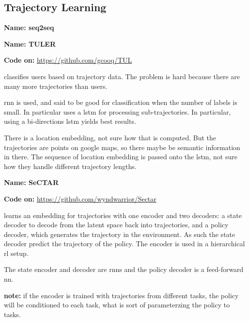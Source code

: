 \subsection{Trajectory Learning}\label{sec: traj learning}



\textbf{Name: seq2seq}

\cite{sutskever2014sequence}


\textbf{Name: TULER}

\textbf{Code on:} \url{https://github.com/gcooq/TUL}

\cite{gao2017identifying} classifies users based on trajectory data. The problem is hard because there are many more trajectories than users.

\gls{rnn} is used, and said to be good for classification when the number of labels is small. In particular uses a \gls{lstm} for processing sub-trajectories.
%
In particular, using a bi-directions \gls{lstm} yields best results. 

There is a location embedding, not sure how that is computed. But the trajectories are points on google maps, so there maybe be semantic information in there.
%
The sequence of location embedding is passed onto the \gls{lstm}, not sure how they handle different trajectory lengths.



\textbf{Name: SeCTAR}

\textbf{Code on:} \url{https://github.com/wyndwarrior/Sectar}

\cite{co2018self} learns an embedding for trajectories with one encoder and two decoders: a state decoder to decode from the latent space back into trajectories, and a policy decoder, which generates the trajectory in the environment. As such the state decoder predict the trajectory of the policy. The encoder is used in a hierarchical \gls{rl} setup.

The state encoder and decoder are \glspl{rnn} and the policy decoder is a feed-forward \gls{nn}.

\textbf{note:} if the encoder is trained with trajectories from different tasks, the policy will be conditioned to each task, what is sort of parameterzing the policy to tasks. 


